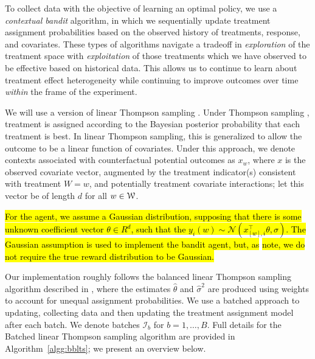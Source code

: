 \documentclass[letterpaper, 12pt, parskip=full,]{scrartcl}
\begin{document}
To collect data with the objective of learning an optimal policy, we use a \textit{contextual bandit} algorithm, in which we sequentially update treatment assignment probabilities based on the observed history of treatments, response, and covariates. These types of algorithms navigate a tradeoff in \textit{exploration} of the treatment space with \textit{exploitation} of those treatments which we have observed to be effective based on historical data. This allows us to continue to learn about treatment effect heterogeneity while continuing to improve outcomes over time \textit{within} the frame of the experiment. 

We will use a version of linear Thompson sampling \citep{agrawal2013thompson}. Under Thompson sampling \citep{thompson1933likelihood,thompson1935theory}, treatment is assigned according to the Bayesian posterior probability that each treatment is best. In linear Thompson sampling, this is generalized to allow the outcome to be a linear function of covariates. Under this approach, we denote contexts associated with counterfactual potential outcomes as $x_w$, where $x$ is the observed covariate vector, augmented by the treatment indicator(s) consistent with treatment $W =w$, and potentially treatment covariate interactions; let this vector be of length $d$ for all $w \in {\EuScript W}$. 

\hl{For the agent, we assume a Gaussian distribution, supposing that there is some unknown coefficient vector $\theta\in R^{d}$, such that the $y_i(w) \sim \mathcal{N}\left( x_{[w],i}^\top \theta, \sigma\right)$. The Gaussian assumption is used to implement the bandit agent, but, as }\cite{agrawal2013thompson}\hl{ note, we do not require the true reward distribution to be Gaussian. }



Our implementation roughly follows the balanced linear Thompson sampling algorithm described in \cite{dimakopoulou2017estimation, dimakopoulou2019balanced}, where the estimates $\hat\theta$ and $\hat\sigma^2$ are produced using weights to account for unequal assignment probabilities. We use a batched approach to updating, collecting data and then updating the treatment assignment model after each batch. We denote batches $\mathcal{I}_b$ for $b = 1, \dots, B$. Full details for the Batched linear Thompson sampling algorithm are provided in Algorithm~\ref{algg:bblts}; we present an overview below. 
\end{document}
